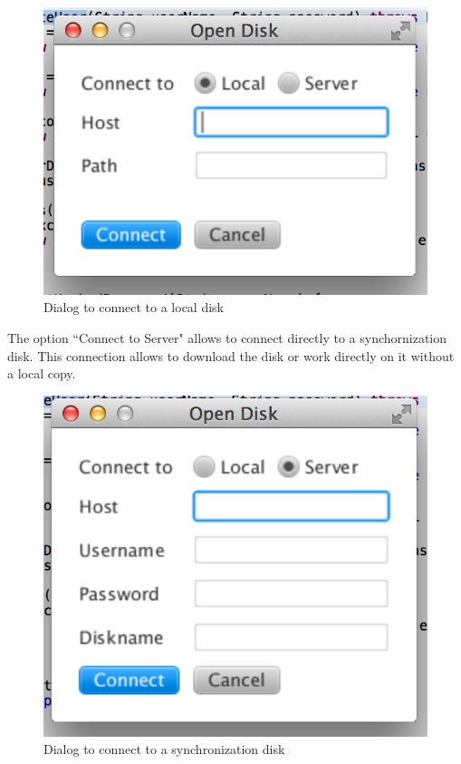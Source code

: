 \documentclass[a4paper,12pt]{article}
\begin{document}
\begin{figure}[H]\centering
    \includegraphics[scale=0.7]{local.png}
    \caption{Dialog to connect to a local disk}
\end{figure}

The option ``Connect to Server" allows to connect directly to a synchornization disk. This connection allows to download the disk or work directly on it without a local copy.

\begin{figure}[H]\centering
    \includegraphics[scale=0.7]{server.png}
    \caption{Dialog to connect to a synchronization disk}
\end{figure}
\end{document}
